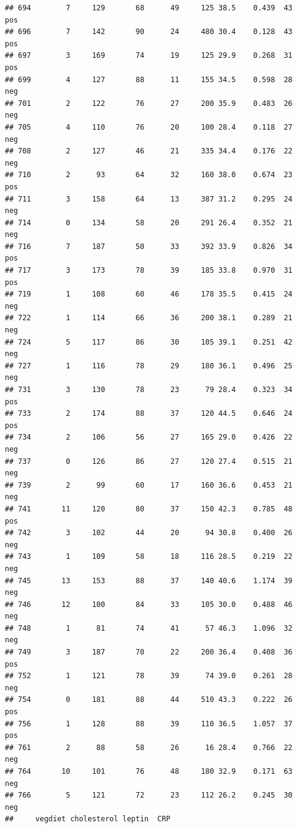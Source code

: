 \documentclass[
]{article}
\begin{document}
\begin{verbatim}
## 694        7     129       68      49     125 38.5    0.439  43      pos
## 696        7     142       90      24     480 30.4    0.128  43      pos
## 697        3     169       74      19     125 29.9    0.268  31      pos
## 699        4     127       88      11     155 34.5    0.598  28      neg
## 701        2     122       76      27     200 35.9    0.483  26      neg
## 705        4     110       76      20     100 28.4    0.118  27      neg
## 708        2     127       46      21     335 34.4    0.176  22      neg
## 710        2      93       64      32     160 38.0    0.674  23      pos
## 711        3     158       64      13     387 31.2    0.295  24      neg
## 714        0     134       58      20     291 26.4    0.352  21      neg
## 716        7     187       50      33     392 33.9    0.826  34      pos
## 717        3     173       78      39     185 33.8    0.970  31      pos
## 719        1     108       60      46     178 35.5    0.415  24      neg
## 722        1     114       66      36     200 38.1    0.289  21      neg
## 724        5     117       86      30     105 39.1    0.251  42      neg
## 727        1     116       78      29     180 36.1    0.496  25      neg
## 731        3     130       78      23      79 28.4    0.323  34      pos
## 733        2     174       88      37     120 44.5    0.646  24      pos
## 734        2     106       56      27     165 29.0    0.426  22      neg
## 737        0     126       86      27     120 27.4    0.515  21      neg
## 739        2      99       60      17     160 36.6    0.453  21      neg
## 741       11     120       80      37     150 42.3    0.785  48      pos
## 742        3     102       44      20      94 30.8    0.400  26      neg
## 743        1     109       58      18     116 28.5    0.219  22      neg
## 745       13     153       88      37     140 40.6    1.174  39      neg
## 746       12     100       84      33     105 30.0    0.488  46      neg
## 748        1      81       74      41      57 46.3    1.096  32      neg
## 749        3     187       70      22     200 36.4    0.408  36      pos
## 752        1     121       78      39      74 39.0    0.261  28      neg
## 754        0     181       88      44     510 43.3    0.222  26      pos
## 756        1     128       88      39     110 36.5    1.057  37      pos
## 761        2      88       58      26      16 28.4    0.766  22      neg
## 764       10     101       76      48     180 32.9    0.171  63      neg
## 766        5     121       72      23     112 26.2    0.245  30      neg
##     vegdiet cholesterol leptin  CRP

\end{verbatim}
\end{document}
